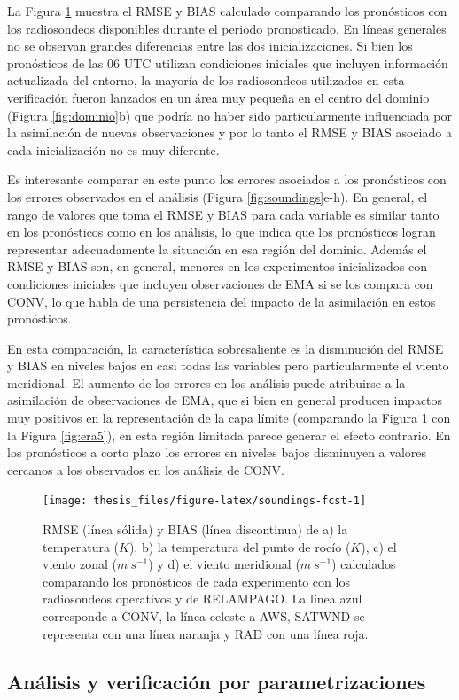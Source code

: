 \documentclass[12pt,oneside,a4paper]{reedthesis}
\begin{document}
La Figura \ref{fig:soundings-fcst} muestra el RMSE y BIAS calculado comparando los pronósticos con los radiosondeos disponibles durante el periodo pronosticado. En líneas generales no se observan grandes diferencias entre las dos inicializaciones. Si bien los pronósticos de las 06 UTC utilizan condiciones iniciales que incluyen información actualizada del entorno, la mayoría de los radiosondeos utilizados en esta verificación fueron lanzados en un área muy pequeña en el centro del dominio (Figura \ref{fig:dominio}b) que podría no haber sido particularmente influenciada por la asimilación de nuevas observaciones y por lo tanto el RMSE y BIAS asociado a cada inicialización no es muy diferente.

Es interesante comparar en este punto los errores asociados a los pronósticos con los errores observados en el análisis (Figura \ref{fig:soundings}e-h). En general, el rango de valores que toma el RMSE y BIAS para cada variable es similar tanto en los pronósticos como en los análisis, lo que indica que los pronósticos logran representar adecuadamente la situación en esa región del dominio. Además el RMSE y BIAS son, en general, menores en los experimentos inicializados con condiciones iniciales que incluyen observaciones de EMA si se los compara con CONV, lo que habla de una persistencia del impacto de la asimilación en estos pronósticos.

En esta comparación, la característica sobresaliente es la disminución del RMSE y BIAS en niveles bajos en casi todas las variables pero particularmente el viento meridional. El aumento de los errores en los análisis puede atribuirse a la asimilación de observaciones de EMA, que si bien en general producen impactos muy positivos en la representación de la capa límite (comparando la Figura \ref{fig:soundings-fcst} con la Figura \ref{fig:era5}), en esta región limitada parece generar el efecto contrario. En los pronósticos a corto plazo los errores en niveles bajos disminuyen a valores cercanos a los observados en los análisis de CONV.


\begin{figure}

{\centering \texttt{[image: thesis\_files/figure-latex/soundings-fcst-1]} 

}

\caption{RMSE (línea sólida) y BIAS (línea discontinua) de a) la temperatura (\(K\)), b) la temperatura del punto de rocío (\(K\)), c) el viento zonal (\(m\ s^{-1}\)) y d) el viento meridional (\(m\ s^{-1}\)) calculados comparando los pronósticos de cada experimento con los radiosondeos operativos y de RELAMPAGO. La línea azul corresponde a CONV, la línea celeste a AWS, SATWND se representa con una línea naranja y RAD con una línea roja.}\label{fig:soundings-fcst}
\end{figure}
\hypertarget{anuxe1lisis-y-verificaciuxf3n-por-parametrizaciones}{%
\subsection{Análisis y verificación por parametrizaciones}\label{anuxe1lisis-y-verificaciuxf3n-por-parametrizaciones}}
\end{document}
